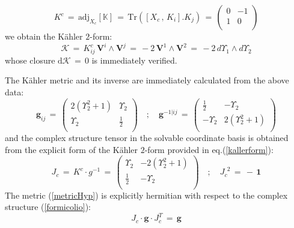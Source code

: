 \documentclass[10pt,a4paper]{article}
\begin{document}
 \begin{equation}\label{aggiungisale}
   K^{c} \, = \, \text{adj}_{X_c}[\mathbb{K}] \, = \,\text{Tr}\left(\left[X_c \, , \, K_i\right].K_j\right) \, = \, \left(
\begin{array}{cc}
 0 & -1 \\
 1 & 0 \\
\end{array}
\right)
 \end{equation}
 we obtain the K\"ahler $2$-form:
 \begin{equation}\label{kallerform}
   \mathcal{K} \, = \, K^{c}_{ij} \, \mathbf{V}^i \wedge \mathbf{V}^j \, = \, -2 \, \mathbf{V}^1 \wedge \mathbf{V}^2 \, = \, -2\, d\Upsilon_1 \wedge d\Upsilon_2
 \end{equation}
 whose closure $\mathrm{d}\mathcal{K}\,= \,0$ is immediately verified.
 \par
 The K\"ahler metric and its inverse are immediately calculated from the above data:
 \begin{equation}\label{metricHyp}
   \mathbf{g}_{ij} \, = \, \left(
\begin{array}{cc}
 2 \left(\Upsilon _2^2+1\right) & \Upsilon _2 \\
 \Upsilon _2 & \frac{1}{2} \\
\end{array}
\right) \quad ; \quad \mathbf{g}^{-1|ij} \, = \, \left(
\begin{array}{cc}
 \frac{1}{2} & -\Upsilon _2 \\
 -\Upsilon _2 & 2 \left(\Upsilon _2^2+1\right) \\
\end{array}
\right)
 \end{equation}
 and the complex structure tensor in the solvable coordinate basis is obtained from the explicit form of the K\"ahler $2$-form provided in eq.(\ref{kallerform}):
 \begin{equation}\label{formicolio}
   J_c \, = \, K^{c}\cdot g^{-1} \, = \, \left(
\begin{array}{cc}
 \Upsilon _2 & -2 \left(\Upsilon _2^2+1\right) \\
 \frac{1}{2} & -\Upsilon _2 \\
\end{array}
\right) \quad ; \quad  J_c^{\phantom{c}2} \, = \, - \, \mathbf{1}
 \end{equation}
 The metric (\ref{metricHyp}) is explicitly hermitian with respect to the complex structure (\ref{formicolio}):
 \begin{equation}\label{saturnali}
   J_c\cdot \mathbf{g} \cdot J_c^T \, = \, \mathbf{g}
 \end{equation}
\end{document}
